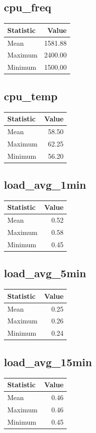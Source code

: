 \documentclass[11pt]{article}
\begin{document}
\subsection{cpu_freq}
\begin{tabular}{lr}
\toprule
Statistic & Value \\
\midrule
Mean & 1581.88 \\
Maximum & 2400.00 \\
Minimum & 1500.00 \\
\bottomrule
\end{tabular}


\subsection{cpu_temp}
\begin{tabular}{lr}
\toprule
Statistic & Value \\
\midrule
Mean & 58.50 \\
Maximum & 62.25 \\
Minimum & 56.20 \\
\bottomrule
\end{tabular}


\subsection{load_avg_1min}
\begin{tabular}{lr}
\toprule
Statistic & Value \\
\midrule
Mean & 0.52 \\
Maximum & 0.58 \\
Minimum & 0.45 \\
\bottomrule
\end{tabular}


\subsection{load_avg_5min}
\begin{tabular}{lr}
\toprule
Statistic & Value \\
\midrule
Mean & 0.25 \\
Maximum & 0.26 \\
Minimum & 0.24 \\
\bottomrule
\end{tabular}


\subsection{load_avg_15min}
\begin{tabular}{lr}
\toprule
Statistic & Value \\
\midrule
Mean & 0.46 \\
Maximum & 0.46 \\
Minimum & 0.45 \\
\bottomrule
\end{tabular}
\end{document}
